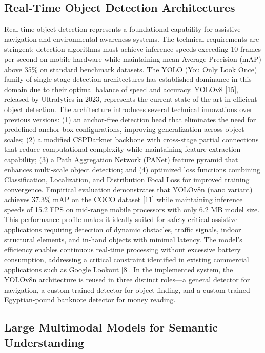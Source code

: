 \documentclass[12pt,a4paper]{report}
\begin{document}
\subsection{Real-Time Object Detection Architectures}

Real-time object detection represents a foundational capability for assistive navigation and environmental awareness systems. The technical requirements are stringent: detection algorithms must achieve inference speeds exceeding 10 frames per second on mobile hardware while maintaining mean Average Precision (mAP) above 35\% on standard benchmark datasets. The YOLO (You Only Look Once) family of single-stage detection architectures has established dominance in this domain due to their optimal balance of speed and accuracy. YOLOv8 [15], released by Ultralytics in 2023, represents the current state-of-the-art in efficient object detection. The architecture introduces several technical innovations over previous versions: (1) an anchor-free detection head that eliminates the need for predefined anchor box configurations, improving generalization across object scales; (2) a modified CSPDarknet backbone with cross-stage partial connections that reduce computational complexity while maintaining feature extraction capability; (3) a Path Aggregation Network (PANet) feature pyramid that enhances multi-scale object detection; and (4) optimized loss functions combining Classification, Localization, and Distribution Focal Loss for improved training convergence. Empirical evaluation demonstrates that YOLOv8n (nano variant) achieves 37.3\% mAP on the COCO dataset [11] while maintaining inference speeds of 15.2 FPS on mid-range mobile processors with only 6.2 MB model size. This performance profile makes it ideally suited for safety-critical assistive applications requiring detection of dynamic obstacles, traffic signals, indoor structural elements, and in-hand objects with minimal latency. The model's efficiency enables continuous real-time processing without excessive battery consumption, addressing a critical constraint identified in existing commercial applications such as Google Lookout [8]. In the implemented system, the YOLOv8n architecture is reused in three distinct roles---a general detector for navigation, a custom-trained detector for object finding, and a custom-trained Egyptian-pound banknote detector for money reading.

\subsection{Large Multimodal Models for Semantic Understanding}
\end{document}
